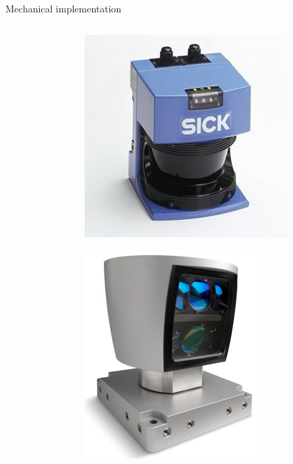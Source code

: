 \documentclass[compress]{beamer}
\begin{document}
\begin{frame}{Mechanical implementation}
\begin{columns}
\begin{column}{0.5\linewidth}
        \end{column}
        \begin{column}{0.5\linewidth}

            \begin{center}
                \includegraphics[width=0.6\linewidth]{SICK_LMS200}

                \includegraphics[width=0.6\linewidth]{velodyne}
            \end{center}
        \end{column}
    \end{columns}

\end{frame}
\end{document}
